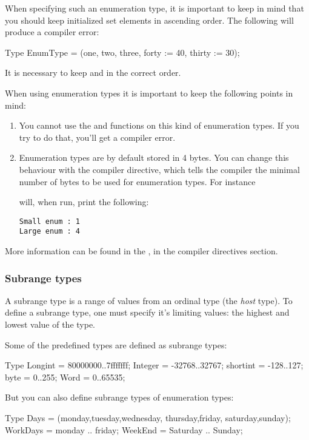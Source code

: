 \documentclass{report}
\begin{document}
When specifying such an enumeration type, it is important to keep in mind
that you should keep initialized set elements in ascending order. The
following will produce a compiler error:
\renewcommand{\prelisting}{\sffamily}
\begin{listing}
Type
  EnumType = (one, two, three, forty := 40, thirty := 30);
\end{listing}
It is necessary to keep  and  in the correct order.

When using enumeration types it is important to keep the following points 
in mind:
\begin{enumerate}
\item You cannot use the  and  functions on
this kind of enumeration types. If you try to do that, you'll get a compiler
error.
\item Enumeration types are by default stored in 4 bytes. You can change
this behaviour with the  compiler directive, which
tells the compiler the minimal number of bytes to be used for enumeration
types.
For instance
will, when run, print the following: 
\begin{verbatim}
Small enum : 1
Large enum : 4
\end{verbatim}
\end{enumerate}
More information can be found in the \progref, in the compiler directives
section.

\subsubsection{Subrange types}

A subrange type is a range of values from an ordinal type (the {\em host}
type). To define a subrange type, one must specify it's limiting values: the
highest and lowest value of the type.



Some of the predefined  types are defined as subrange types:
\begin{listing}
Type 
  Longint  = $80000000..$7fffffff;
  Integer  = -32768..32767;
  shortint = -128..127;
  byte     = 0..255;
  Word     = 0..65535;
\end{listing}
But you can also define subrange types of enumeration types:
\begin{listing}
Type 
  Days = (monday,tuesday,wednesday, thursday,friday,
          saturday,sunday);
  WorkDays = monday .. friday;
  WeekEnd = Saturday .. Sunday;
\end{listing}
\end{document}
